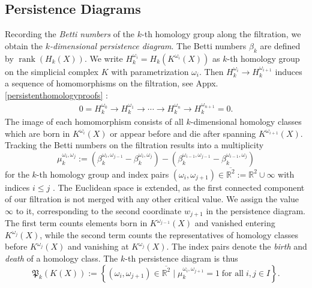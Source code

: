 \documentclass[envcountsect,runningheads]{llncs}
\DeclareMathOperator{\rank}{rank}
\begin{document}
\subsection{Persistence Diagrams}
Recording the \emph{Betti numbers} of the $k$-th homology group along the filtration, we obtain the \emph{$k$-dimensional persistence diagram}. The Betti numbers $\beta_k$ are defined by $\rank(H_k(X))$. We write $H^{\omega_i}_k = H_k(K^{\omega_i}(X))$ as $k$-th homology group on the simplicial complex $K$ with parametrization $\omega_i$. Then $H^{\omega_{i}}_{k} \rightarrow H^{\omega_{i+1}}_k$ induces a sequence of homomorphisms on the filtration, see Appx. \ref{persistenthomologyproofs} :
\begin{align}
0 = H^{\omega_{0}}_k \rightarrow H^{\omega_{1}}_k \rightarrow \cdots \rightarrow H^{\omega_{n}}_k \rightarrow H^{\omega_{n+1}}_k = 0.
\end{align}
The image of each homomorphism consists of all $k$-dimensional homology classes which are born in $K^{\omega_i}(X)$ or appear before and die after spanning $K^{\omega_{i+1}}(X)$. Tracking the Betti numbers on the filtration results into a multiplicity
\begin{equation}
\mu^{\omega_{i},\omega_{j}}_k := (\beta_k^{\omega_{i},\omega_{j-1}} - \beta_k^{\omega_i,\omega_{j}})-(\beta_k^{\omega_{i-1},\omega_{j-1}}-\beta_k^{\omega_{i-1},\omega_{j}})
\end{equation}
for the $k$-th homology group and index pairs $(\omega_i,\omega_{j+1}) \in \overline{\mathbb{R}^2} := \mathbb{R}^2 \cup \infty$ with indices $i \leq j$ . The Euclidean space is extended, as the first connected component of our filtration is not merged with any other critical value. We assign the value $\infty$ to it, corresponding to the second coordinate $w_{j+1}$ in the persistence diagram. The first term counts elements born in $K^{\omega_{j-1}}(X)$ and vanished entering $K^{\omega_{j}}(X)$, while the second term counts the representatives of homology classes before $K^{\omega_{j}}(X)$ and vanishing at $K^{\omega_{j}}(X)$. The index pairs denote the \emph{birth} and \emph{death} of a homology class. The $k$-th persistence diagram is thus
\begin{equation}
\mathfrak{P}_k(K(X)) := \left\{(\omega_i, \omega_{j+1}) \in \overline{\mathbb{R}^2} \; \bigg\vert \; \mu^{\omega_{i},\omega_{j+1}}_k = 1 \; \text{for all} \; i,j \in I \right\}.
\end{equation}
\end{document}
